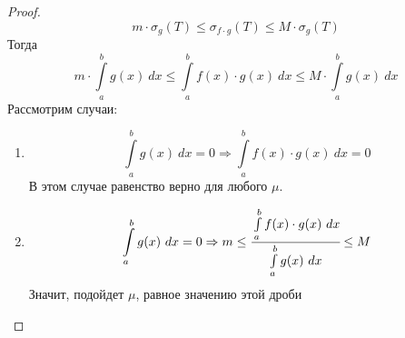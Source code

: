 \begin{proof}
    \[m\cdot \sigma_g(T) \leq \sigma_{f\cdot g}(T) \leq M\cdot\sigma_g(T)\]
    Тогда
    \[m\cdot \int\limits_{a}^{b} g(x)\ dx \leq \int\limits_{a}^{b} f(x)\cdot g(x)\ dx \leq M\cdot\int\limits_{a}^{b} g(x)\ dx\]
    Рассмотрим случаи:
    \begin{enumerate}
        \item 
        \[\int\limits_{a}^{b} g(x)\ dx = 0 \Rightarrow \int\limits_{a}^{b} f(x)\cdot g(x)\ dx = 0\]
        В этом случае равенство верно для любого $\mu$.
        \item
        \[\int\limits_{a}^{b} g(x)\ dx = 0 \Rightarrow m\leq \cfrac{\int\limits_{a}^{b} f(x)\cdot g(x)\ dx}{\int\limits_{a}^{b} g(x)\ dx}\leq M\]
        Значит, подойдет $\mu$, равное значению этой дроби
    \end{enumerate}
\end{proof}
